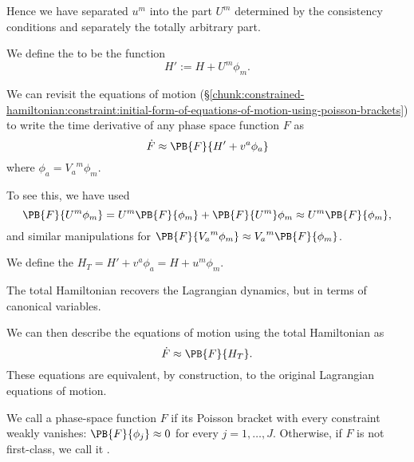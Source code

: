 Hence we have separated $u^{m}$ into the part $U^{m}$ determined by the
consistency conditions and separately the totally arbitrary part.

\begin{definition}
We define the  to be the function
\begin{equation}
H' := H + U^{m}\phi_{m}.
\end{equation}
\end{definition}

We can revisit the equations of motion (\S\ref{chunk:constrained-hamiltonian:constraint:initial-form-of-equations-of-motion-using-poisson-brackets})
to write the time derivative of any phase space function $F$ as
\begin{equation}
\dot{F}\weakEq\PB{F}{H' + v^{a}\phi_{a}}
\end{equation}
where $\phi_{a} = {V_{a}}^{m}\phi_{m}$.

To see this, we have used
\begin{equation}
\PB{F}{U^{m}\phi_{m}} = U^{m}\PB{F}{\phi_{m}}+\PB{F}{U^{m}}\phi_{m}
\weakEq U^{m}\PB{F}{\phi_{m}},
\end{equation}
and similar manipulations for $\PB{F}{{V_{a}}^{m}\phi_{m}}\weakEq{V_{a}}^{m}\PB{F}{\phi_{m}}$.

\begin{definition}
We define the  $H_{T} = H' + v^{a}\phi_{a} = H + u^{m}\phi_{m}$.
\end{definition}

\begin{remark}
The total Hamiltonian recovers the Lagrangian dynamics, but in terms of
canonical variables.
\end{remark}

\M
We can then describe the equations of motion using the total Hamiltonian
as
\begin{equation}
\dot{F}\weakEq\PB{F}{H_{T}}.
\end{equation}
These equations are equivalent, by construction, to the original
Lagrangian equations of motion.

\begin{definition}
We call a phase-space function $F$  if its Poisson
bracket with every constraint weakly
vanishes: $\PB{F}{\phi_{j}}\weakEq0$ for every $j=1,\dots,J$.
Otherwise, if $F$ is not first-class, we call it .
\end{definition}

